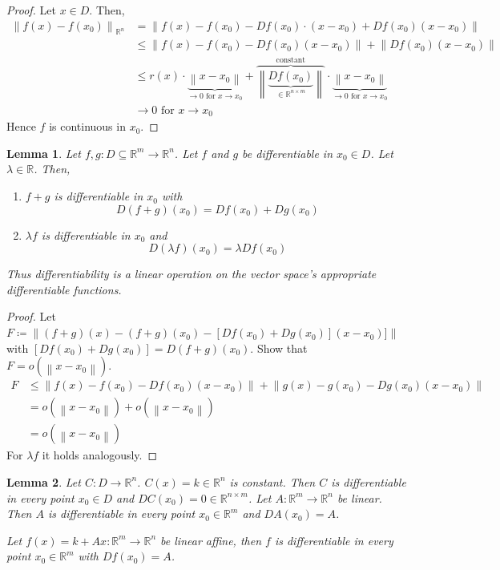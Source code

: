 \documentclass{article}
\newtheorem{lemma}{Lemma}  \numberwithin{lemma}{section}
\newcommand{\norm}[1]{\left\|#1\right\|}
\begin{document}
\begin{proof}
  Let $x \in D$. Then,
  \begin{align*}
    \norm{f(x) - f(x_0)}_{\mathbb R^n}
      &= \norm{f(x) - f(x_0) - Df(x_0) \cdot (x - x_0) + Df(x_0) (x - x_0)} \\
      &\leq \norm{f(x) - f(x_0) - Df(x_0) (x - x_0)} + \norm{Df(x_0) (x - x_0)} \\
      &\leq r(x) \cdot \underbrace{\norm{x - x_0}}_{\to 0 \text{ for } x \to x_0} + \overbrace{\norm{\underbrace{Df(x_0)}_{\in \mathbb R^{n\times m}}}}^{\text{constant}} \cdot \underbrace{\norm{x - x_0}}_{\to 0 \text{ for } x \to x_0} \\
      &\to 0 \text{ for } x \to x_0
  \end{align*}
  Hence $f$ is continuous in $x_0$.
\end{proof}

\begin{lemma} %
  \label{lem5}
  Let $f,g: D \subseteq \mathbb R^m \to \mathbb R^n$. Let $f$ and $g$ be differentiable in $x_0 \in D$.
  Let $\lambda \in \mathbb R$. Then,
  \begin{enumerate}
    \item $f + g$ is differentiable in $x_0$ with
      \[ D(f + g)(x_0) = Df(x_0) + Dg(x_0) \]
    \item $\lambda f$ is differentiable in $x_0$ and
      \[ D(\lambda f)(x_0) = \lambda Df(x_0) \]
  \end{enumerate}
  Thus differentiability is a linear operation on the vector space's appropriate differentiable functions.
\end{lemma}

\begin{proof}
  Let $F \coloneqq \norm{(f + g)(x) - (f + g)(x_0) - [Df(x_0) + Dg(x_0)](x - x_0)]}$
  with $[Df(x_0) + Dg(x_0)] = D(f + g)(x_0)$.
  Show that $F = o(\norm{x - x_0})$.
  \begin{align*}
    F &\leq \norm{f(x) - f(x_0) - Df(x_0)(x - x_0)} + \norm{g(x) - g(x_0) - Dg(x_0)(x - x_0)} \\
      &= o(\norm{x - x_0}) + o(\norm{x - x_0}) \\
      &= o(\norm{x - x_0})
  \end{align*}
  For $\lambda f$ it holds analogously.
\end{proof}

\begin{lemma} %
  Let $C: D \to \mathbb R^n$. $C(x) = k \in \mathbb R^n$ is constant.
  Then $C$ is differentiable in every point $x_0 \in D$ and $D C(x_0) = 0 \in \mathbb R^{n\times m}$.
  Let $A: \mathbb R^m \to \mathbb R^n$ be linear. Then $A$ is differentiable in every point $x_0 \in \mathbb R^m$ and $DA(x_0) = A$.

  Let $f(x) = k + Ax: \mathbb R^m \to \mathbb R^n$ be linear affine, then $f$ is differentiable in every point $x_0 \in \mathbb R^m$ with $Df(x_0) = A$.
\end{lemma}
\end{document}
